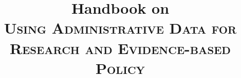 \documentclass{book}
\title{\large Handbook on \\ \huge \scshape {Using Administrative Data for Research and Evidence-based Policy}}
\author{\authorthing}
\date{ }
\makeatletter
\renewcommand{\pagenumbering}[1]{\gdef\thepage{\csname
@#1\endcsname\c@page}}
\makeatother
\begin{document}
\pagenumbering{roman}

\frontmatter

\maketitle

\newpage

\tableofcontents

\newpage
\pagestyle{fancy}

\pagenumbering{arabic} %
\mainmatter


\end{document}
